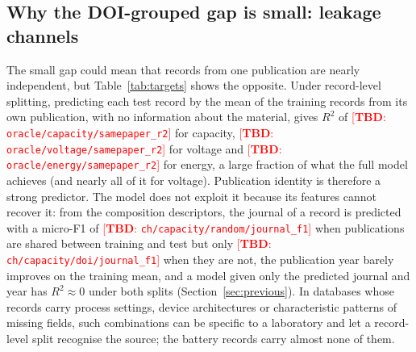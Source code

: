 \documentclass[journal=jcisd8,manuscript=article,layout=traditional]{achemso}
\newcommand{\TBD}[1]{\textcolor{red}{[\textbf{TBD}: \nolinkurl{#1}]}}
\begin{document}
\subsection{Why the DOI-grouped gap is small: leakage channels}
\label{sec:channels}

The small gap could mean that records from one publication are nearly independent, but Table~\ref{tab:targets} shows the opposite. Under record-level splitting, predicting each test record by the mean of the training records from its own publication, with no information about the material, gives $R^2$ of \TBD{oracle/capacity/samepaper_r2} for capacity, \TBD{oracle/voltage/samepaper_r2} for voltage and \TBD{oracle/energy/samepaper_r2} for energy, a large fraction of what the full model achieves (and nearly all of it for voltage). Publication identity is therefore a strong predictor. The model does not exploit it because its features cannot recover it: from the composition descriptors, the journal of a record is predicted with a micro-F1 of \TBD{ch/capacity/random/journal_f1} when publications are shared between training and test but only \TBD{ch/capacity/doi/journal_f1} when they are not, the publication year barely improves on the training mean, and a model given only the predicted journal and year has $R^2 \approx 0$ under both splits (Section~\ref{sec:previous}). In databases whose records carry process settings, device architectures or characteristic patterns of missing fields, such combinations can be specific to a laboratory and let a record-level split recognise the source; the battery records carry almost none of them.
\end{document}
